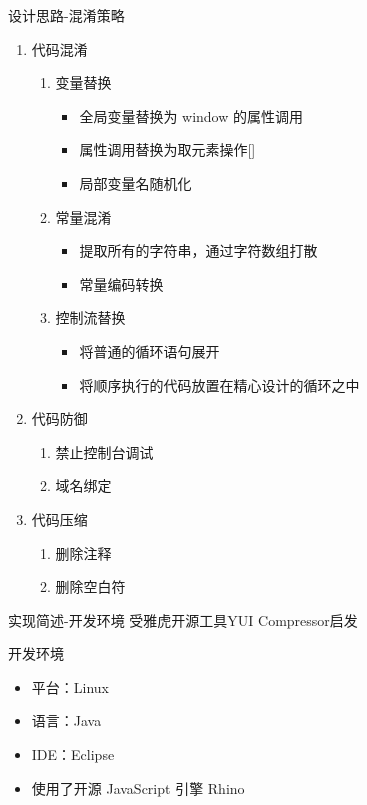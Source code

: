 \documentclass[presentation]{beamer}
\begin{document}
\begin{frame}[label=sec-9]{设计思路-混淆策略}
\begin{enumerate}
\item 代码混淆
\begin{enumerate}
\item 变量替换
\begin{itemize}
\item 全局变量替换为 window 的属性调用
\item 属性调用替换为取元素操作[]
\item 局部变量名随机化
\end{itemize}
\item 常量混淆
\begin{itemize}
\item 提取所有的字符串，通过字符数组打散
\item 常量编码转换
\end{itemize}
\item 控制流替换
\begin{itemize}
\item 将普通的循环语句展开
\item 将顺序执行的代码放置在精心设计的循环之中
\end{itemize}
\end{enumerate}
\item 代码防御
\begin{enumerate}
\item 禁止控制台调试
\item 域名绑定
\end{enumerate}
\item 代码压缩
\begin{enumerate}
\item 删除注释
\item 删除空白符
\end{enumerate}
\end{enumerate}
\end{frame}
\begin{frame}[label=sec-10]{实现简述-开发环境}
受雅虎开源工具YUI Compressor启发
\begin{block}{开发环境}
\begin{itemize}
\item 平台：Linux
\item 语言：Java
\item IDE：Eclipse
\item 使用了开源 JavaScript 引擎 Rhino
\end{itemize}
\end{block}
\end{frame}
\end{document}
